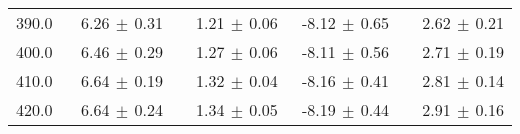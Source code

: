 \begin{table}[htbp]
\begin{center}
\begin{tabular}{|c||r|r||r|r|}
390.0 &  6.26$\,\pm\,$0.31$\;\;\;$ &  1.21$\,\pm\,$0.06$\;\;\;\;$ & -8.12$\,\pm\,$0.65$\;\;$ &  2.62$\,\pm\,$0.21$\;\;\;\;$ \\ 
400.0 &  6.46$\,\pm\,$0.29$\;\;\;$ &  1.27$\,\pm\,$0.06$\;\;\;\;$ & -8.11$\,\pm\,$0.56$\;\;$ &  2.71$\,\pm\,$0.19$\;\;\;\;$ \\ 
410.0 &  6.64$\,\pm\,$0.19$\;\;\;$ &  1.32$\,\pm\,$0.04$\;\;\;\;$ & -8.16$\,\pm\,$0.41$\;\;$ &  2.81$\,\pm\,$0.14$\;\;\;\;$ \\ 
420.0 &  6.64$\,\pm\,$0.24$\;\;\;$ &  1.34$\,\pm\,$0.05$\;\;\;\;$ & -8.19$\,\pm\,$0.44$\;\;$ &  2.91$\,\pm\,$0.16$\;\;\;\;$ \\ 
\hline 
\end{tabular} 

\end{center} 
\end{table} 
